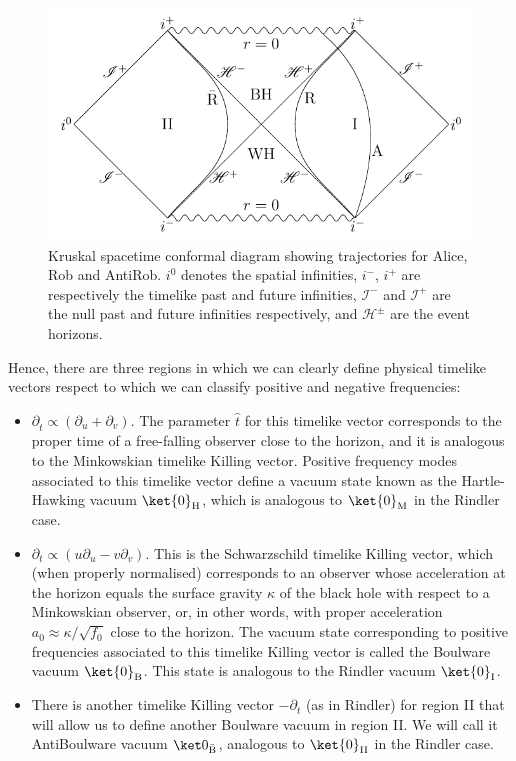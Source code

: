 \begin{figure}[h]
\begin{center}
\includegraphics[width=.85\textwidth]{fig-kruskal}
\caption{Kruskal spacetime  conformal diagram showing trajectories for Alice,
Rob and AntiRob. $i^0$ denotes the spatial infinities, $i^-$, $i^+$
are respectively the timelike past and future infinities,
$\mathscr{I}^-$ and $\mathscr{I}^+$ are the null past and future infinities
respectively, and $\mathscr{H}^\pm$ are the event horizons.}
\label{Kruskal}
\end{center}
\end{figure}

Hence, there are three regions in which we can clearly define physical
timelike vectors respect to which we can classify positive and negative
frequencies:
\begin{itemize}
\item  $\partial_{\hat t}\propto (\partial_{u}+\partial_{v})$.
The parameter $\hat t$ for this timelike vector corresponds to the
proper time of a free-falling observer close to the horizon, and it is
analogous to the Minkowskian   timelike Killing vector. Positive
frequency modes associated to this timelike vector define a vacuum
state known as the Hartle-Hawking vacuum $\ket{0}_\text{H}$,
which is analogous to $\ket{0}_\text{M}$ in the Rindler case.


\item $\partial_{t}\propto (u\partial_{u}-v\partial_{v})$.
 This is the Schwarzschild timelike Killing vector, which (when properly
normalised) corresponds to an observer whose acceleration at the
horizon equals the surface gravity $\kappa$ of the black hole with
respect to a Minkowskian observer, or, in other words, with proper
acceleration $a_0\approx\kappa/\sqrt{f_0}$ close to the horizon.
The vacuum state corresponding to positive frequencies associated to
this timelike Killing vector is called the Boulware vacuum
$\ket{0}_\text{B}$. This state is analogous to the Rindler vacuum
$\ket{0}_\text{I}$.

\item There is another timelike Killing vector $-\partial_{t}$
(as in Rindler) for region II that will allow us to define another
Boulware vacuum  in region II. We will call it AntiBoulware vacuum
$\ket0_{\bar{\text{B}}}$, analogous to $\ket{0}_\text{II}$ in the
Rindler case.
\end{itemize}

